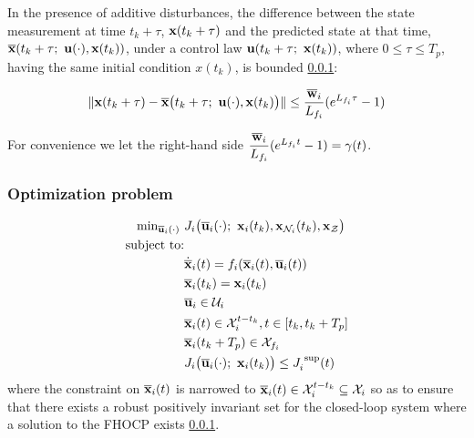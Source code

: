 \begin{bw_box}
\begin{lemma}
  In the presence of additive disturbances, the difference between the state
  measurement at time $t_k + \tau$, $\bm{\mathbf{x}}(t_k + \tau)$ and the predicted
  state at that time, $\overline{\bm{\mathbf{x}}}(t_k + \tau;\ \bm{\mathbf{u}}(\cdot), \bm{\mathbf{x}}(t_k))$,
  under a control law $\bm{\mathbf{u}}(t_k + \tau;\ \bm{\mathbf{x}}(t_k))$, where
  $0 \leq \tau \leq T_p$, having the same initial condition $x(t_k)$, is
  bounded \ref{}:

  \begin{align}
    \|\vect{x}(t_k + \tau) - \overline{\vect{x}}\big(t_k + \tau;\ \vect{u}(\cdot), \vect{x}(t_k)\big)\|
    \leq \frac{\overline{\vect{w}}_i}{L_{f_i}} (e^{L_{f_i} \tau} - 1)
  \end{align}

  \label{lemma:gamma_tau}
\end{lemma}
\end{bw_box}

For convenience we let the right-hand side
$\dfrac{\overline{\bm{\mathbf{w}}}_i}{L_{f_i}} (e^{L_{f_i} t} - 1) = \gamma(t)$.


\subsubsection{Optimization problem}

\begin{align}
  \text{min}_{\overline{\bm{\mathbf{u}}}_i (\cdot)}\ &
    J_i \big(\overline{\bm{\mathbf{u}}}_i (\cdot);\ \bm{\mathbf{x}}_i(t_k), \bm{\mathbf{x}}_{\mathcal{N}_i}(t_k), \bm{\mathbf{x}}_{\mathcal{Z}}\big) \\
  \text{subject to:} & \\
  & \dot{\overline{\bm{\mathbf{x}}}}_i(t) = f_i (\overline{\bm{\mathbf{x}}}_i (t), \overline{\bm{\mathbf{u}}}_i (t)) \\
  & \overline{\bm{\mathbf{x}}}_i (t_k) = \bm{\mathbf{x}}_i (t_k) \\
  & \overline{\bm{\mathbf{u}}}_i \in \mathcal{U}_i \\
  & \overline{\bm{\mathbf{x}}}_i (t) \in \mathcal{X}_i^{t - t_k}, t \in [t_k, t_k + T_p] \\
  & \overline{\bm{\mathbf{x}}}_i (t_k + T_p) \in \mathcal{X}_{f_i} \\
  & J_i \big(\overline{\bm{\mathbf{u}}}_i (\cdot);\ \bm{\mathbf{x}}_i(t_k)\big) \leq J_i^{\text{ sup}}(t)
\end{align}
where the constraint on $\overline{\bm{\mathbf{x}}}_i (t)$ is narrowed to
$\overline{\bm{\mathbf{x}}}_i (t) \in \mathcal{X}_i^{t - t_k} \subseteq \mathcal{X}_i$
so as to ensure that there exists a robust positively invariant set for the
closed-loop system where a solution to the FHOCP exists \ref{}.

